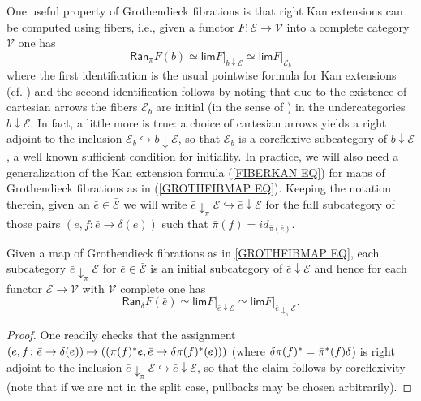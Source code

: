 \documentclass[a4paper,10pt]{article}%
\begin{document}
One useful property of Grothendieck fibrations is that
right Kan extensions can be computed using fibers, i.e., 
given a functor $F \colon \mathcal{E} \to \mathcal{V}$ into a complete category $\mathcal{V}$ one has
\begin{equation}\label{FIBERKAN EQ}
	\mathsf{Ran}_{\pi}F (b)
\simeq
	\mathsf{lim} F{|_{b \downarrow \mathcal{E}}}
\simeq
	\mathsf{lim} F|_{\mathcal{E}_b}
\end{equation}
where the first identification is the usual pointwise formula for Kan extensions (cf. \cite[X.3 Thm. 1]{McL})
and the second identification follows by noting that due to the existence of cartesian arrows the fibers
$\mathcal{E}_b$ are initial (in the sense of \cite[IX.3]{McL})
in the undercategories $b \downarrow \mathcal{E}$.
In fact, a little more is true: a choice of cartesian arrows 
yields a right adjoint to the inclusion
$\mathcal{E}_b \hookrightarrow b \downarrow \mathcal{E}$, so that $\mathcal{E}_b$ is a coreflexive subcategory of 
$b \downarrow \mathcal{E}$,
a well known sufficient condition for initiality.
In practice, we will also need a generalization of the Kan extension formula (\ref{FIBERKAN EQ}) for maps of Grothendieck fibrations as in (\ref{GROTHFIBMAP EQ}).
Keeping the notation therein, given an $\bar{e} \in \bar{\mathcal{E}}$ we will write 
$\bar{e} \downarrow_{\pi} \mathcal{E} \hookrightarrow
\bar{e} \downarrow \mathcal{E}$
for the full subcategory of those pairs 
$\left(e,f \colon \bar{e} \to \delta(e)\right)$
such that $\bar{\pi}(f) = id_{\bar{\pi}(\bar{e})}$.


\begin{proposition}\label{FIBERKANMAP PROP}
	Given a map of Grothendieck fibrations
	as in \eqref{GROTHFIBMAP EQ},
	each subcategory $\bar{e} \downarrow_{\pi} \mathcal{E}$
	for $\bar{e} \in \bar{\mathcal{E}}$
	is an initial subcategory of $\bar{e} \downarrow \mathcal{E}$
	and hence for each functor 
	$\mathcal{E} \to \mathcal{V}$
	with $\mathcal{V}$ complete one has
\begin{equation}\label{FIBERKANMAP EQ}
	\mathsf{Ran}_{\delta}F (\bar{e})
\simeq
	\mathsf{lim} F{|_{\bar{e} \downarrow \mathcal{E}}}
\simeq
	\mathsf{lim} F|_{\bar{e} \downarrow_{\pi} \mathcal{E}}.
\end{equation}	
\end{proposition}

\begin{proof}
One readily checks that the assignment
$
	(e,f\colon\bar{e} \to \delta(e))
\mapsto
	\left(
	(\pi(f)^{\**}e, \bar{e} \to \delta \pi(f)^{\**}(e))
	\right)
$
(where $\delta \pi(f)^{\**} = \bar{\pi}^{\**}(f) \delta$) is  right adjoint to the inclusion
$\bar{e} \downarrow_{\pi} \mathcal{E} \hookrightarrow
\bar{e} \downarrow \mathcal{E}$, so that the claim follows by coreflexivity 
(note that if we are not in the split case, pullbacks may be chosen arbitrarily).
\end{proof}
\end{document}

